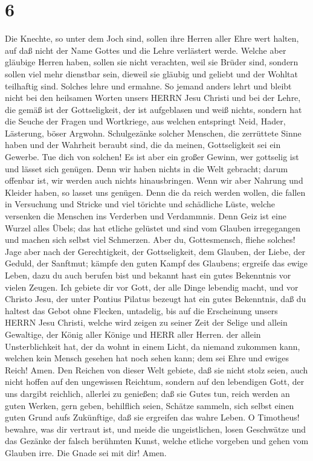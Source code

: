 \hypertarget{section-5}{%
\section{6}\label{section-5}}

 Die Knechte, so unter dem Joch sind, sollen ihre Herren
aller Ehre wert halten, auf daß nicht der Name Gottes und die Lehre
verlästert werde.  Welche aber gläubige Herren haben, sollen
sie nicht verachten, weil sie Brüder sind, sondern sollen viel mehr
dienstbar sein, dieweil sie gläubig und geliebt und der Wohltat
teilhaftig sind. Solches lehre und ermahne.  So jemand
anders lehrt und bleibt nicht bei den heilsamen Worten unsers HERRN Jesu
Christi und bei der Lehre, die gemäß ist der Gottseligkeit, 
der ist aufgeblasen und weiß nichts, sondern hat die Seuche der Fragen
und Wortkriege, aus welchen entspringt Neid, Hader, Lästerung, böser
Argwohn.  Schulgezänke solcher Menschen, die zerrüttete
Sinne haben und der Wahrheit beraubt sind, die da meinen, Gottseligkeit
sei ein Gewerbe. Tue dich von solchen!  Es ist aber ein
großer Gewinn, wer gottselig ist und lässet sich genügen. 
Denn wir haben nichts in die Welt gebracht; darum offenbar ist, wir
werden auch nichts hinausbringen.  Wenn wir aber Nahrung und
Kleider haben, so lasset uns genügen.  Denn die da reich
werden wollen, die fallen in Versuchung und Stricke und viel törichte
und schädliche Lüste, welche versenken die Menschen ins Verderben und
Verdammnis.  Denn Geiz ist eine Wurzel alles Übels; das hat
etliche gelüstet und sind vom Glauben irregegangen und machen sich
selbst viel Schmerzen.  Aber du, Gottesmensch, fliehe
solches! Jage aber nach der Gerechtigkeit, der Gottseligkeit, dem
Glauben, der Liebe, der Geduld, der Sanftmut;  kämpfe den
guten Kampf des Glaubens; ergreife das ewige Leben, dazu du auch berufen
bist und bekannt hast ein gutes Bekenntnis vor vielen Zeugen.
 Ich gebiete dir vor Gott, der alle Dinge lebendig macht,
und vor Christo Jesu, der unter Pontius Pilatus bezeugt hat ein gutes
Bekenntnis,  daß du haltest das Gebot ohne Flecken,
untadelig, bis auf die Erscheinung unsers HERRN Jesu Christi,
 welche wird zeigen zu seiner Zeit der Selige und allein
Gewaltige, der König aller Könige und HERR aller Herren. 
der allein Unsterblichkeit hat, der da wohnt in einem Licht, da niemand
zukommen kann, welchen kein Mensch gesehen hat noch sehen kann; dem sei
Ehre und ewiges Reich! Amen.  Den Reichen von dieser Welt
gebiete, daß sie nicht stolz seien, auch nicht hoffen auf den ungewissen
Reichtum, sondern auf den lebendigen Gott, der uns dargibt reichlich,
allerlei zu genießen;  daß sie Gutes tun, reich werden an
guten Werken, gern geben, behilflich seien,  Schätze
sammeln, sich selbst einen guten Grund aufs Zukünftige, daß sie
ergreifen das wahre Leben.  O Timotheus! bewahre, was dir
vertraut ist, und meide die ungeistlichen, losen Geschwätze und das
Gezänke der falsch berühmten Kunst,  welche etliche
vorgeben und gehen vom Glauben irre. Die Gnade sei mit dir! Amen.
